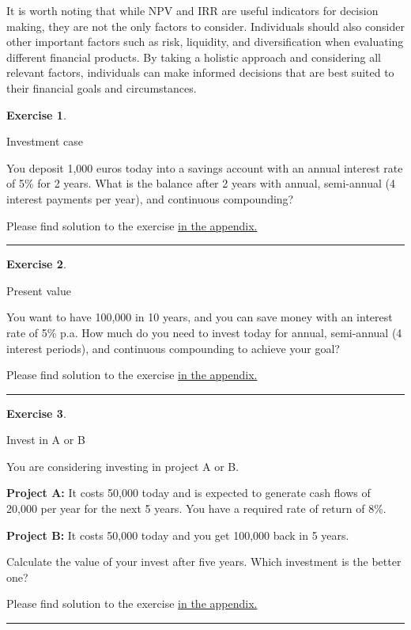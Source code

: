 \documentclass[
  12pt,
  oneside]{book}
\theoremstyle{definition}
\theoremstyle{definition}
\theoremstyle{definition}
\newtheorem{exercise}{Exercise}[chapter]
\theoremstyle{definition}
\theoremstyle{remark}
\begin{document}
It is worth noting that while NPV and IRR are useful indicators for decision making, they are not the only factors to consider. Individuals should also consider other important factors such as risk, liquidity, and diversification when evaluating different financial products. By taking a holistic approach and considering all relevant factors, individuals can make informed decisions that are best suited to their financial goals and circumstances.

\begin{exercise}
\protect\hypertarget{exr:invcase}{}\label{exr:invcase}

Investment case

You deposit 1,000 euros today into a savings account with an annual interest rate of 5\% for 2 years. What is the balance after 2 years with annual, semi-annual (4 interest payments per year), and continuous compounding?

Please find solution to the exercise \hyperref[sol:invcase]{in the appendix.}

\begin{center}\rule{0.5\linewidth}{0.5pt}\end{center}

\end{exercise}

\begin{exercise}
\protect\hypertarget{exr:presentvalueC}{}\label{exr:presentvalueC}

Present value

You want to have 100,000 in 10 years, and you can save money with an interest rate of 5\% p.a. How much do you need to invest today for annual, semi-annual (4 interest periods), and continuous compounding to achieve your goal?

Please find solution to the exercise \hyperref[sol:presentvalueC]{in the appendix.}

\begin{center}\rule{0.5\linewidth}{0.5pt}\end{center}

\end{exercise}

\begin{exercise}
\protect\hypertarget{exr:invaorb}{}\label{exr:invaorb}

Invest in A or B

You are considering investing in project A or B.

\textbf{Project A:} It costs 50,000 today and is expected to generate cash flows of 20,000 per year for the next 5 years. You have a required rate of return of 8\%.

\textbf{Project B:} It costs 50,000 today and you get 100,000 back in 5 years.

Calculate the value of your invest after five years. Which investment is the better one?

Please find solution to the exercise \hyperref[sol:invaorb]{in the appendix.}

\begin{center}\rule{0.5\linewidth}{0.5pt}\end{center}

\end{exercise}
\end{document}
